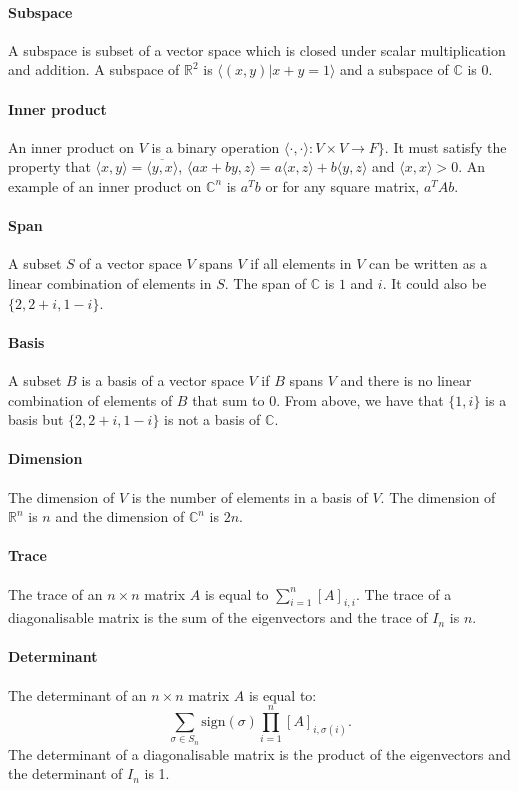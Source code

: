 \documentclass[]{article}
\begin{document}
\paragraph{Subspace} A subspace is subset of a vector space which is closed under scalar multiplication and addition. A subspace of $\mathbb{R}^2$ is $ \langle (x, y) | x + y = 1 \rangle$ and a subspace of $\mathbb{C}$ is $0$. 
\paragraph{Inner product} An inner product on $V$ is a binary operation $\langle \cdot, \cdot \rangle : V \times V \rightarrow F \rbrace$. It must satisfy the property that $\langle x, y \rangle  = \overline{\langle y, x \rangle}$, $\langle ax + by, z \rangle = a \langle x, z \rangle + b \langle y , z \rangle$ and $\langle x, x \rangle > 0$. An example of an inner product on $\mathbb{C}^n$ is $a^T b$ or for any square matrix, $a^T Ab$. 
\paragraph{Span} A subset $S$ of a vector space $V$ spans $V$ if all elements in $V$ can be written as a linear combination of elements in $S$. The span of $\mathbb{C}$ is $1$ and $i$. It could also be $\lbrace 2, 2 + i, 1 - i \rbrace$. 
\paragraph{Basis} A subset $B$ is a basis of a vector space $V$ if $B$ spans $V$ and there is no linear combination of elements of $B$ that sum to 0. From above, we have that $\lbrace 1, i \rbrace$ is a basis but $\lbrace 2, 2 + i, 1-i \rbrace$ is not a basis of $\mathbb{C}$.
\paragraph{Dimension} The dimension of $V$ is the number of elements in a basis of $V$. The dimension of $\mathbb{R}^n$ is $n$ and the dimension of $\mathbb{C}^n$ is $2n$. 
\paragraph{Trace} The trace of an $n \times n$ matrix $A$ is equal to $\sum_{i=1}^n [A]_{i,i}$. The trace of a diagonalisable matrix is the sum of the eigenvectors and the trace of $I_n$ is $n$.
\paragraph{Determinant} The determinant of an  $n \times n$ matrix $A$ is equal to:
\begin{equation}
	\sum_{\sigma \in S_n} \text{sign}(\sigma) \prod_{i = 1}^n [A]_{i, \sigma(i)}.
\end{equation} 
The determinant of a diagonalisable matrix is the product of the eigenvectors and the determinant of $I_n$ is 1. 
\end{document}
